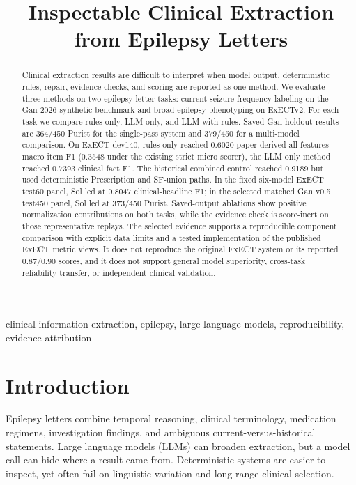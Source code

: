 \documentclass[conference]{IEEEtran}
\begin{document}
\title{Inspectable Clinical Extraction from Epilepsy Letters}

\author{}

\maketitle

\begin{abstract}
Clinical extraction results are difficult to interpret when model output,
deterministic rules, repair, evidence checks, and scoring are reported as one
method. We evaluate three methods on two
epilepsy-letter tasks: current seizure-frequency labeling on the Gan 2026
synthetic benchmark and broad epilepsy phenotyping on ExECTv2. For each task we
compare rules only, LLM only, and LLM with rules. Saved Gan holdout results are
364/450 Purist for the single-pass system and 379/450 for a multi-model
comparison. On ExECT dev140, rules only reached 0.6020 paper-derived all-features
macro item F1 (0.3548 under the existing strict micro scorer), the LLM only
method reached 0.7393 clinical fact F1. The historical combined control reached
0.9189 but used deterministic Prescription and SF-union paths. In the fixed
six-model ExECT test60 panel, Sol led at 0.8047 clinical-headline F1; in the
selected matched Gan v0.5 test450 panel, Sol led at 373/450 Purist.
Saved-output ablations show positive normalization contributions on both tasks,
while the evidence check is score-inert on those representative replays. The
selected evidence supports a reproducible component comparison with explicit
data limits and a tested implementation of the published ExECT metric views. It
does not reproduce the original ExECT system or its reported 0.87/0.90 scores,
and it does not support general model superiority, cross-task reliability
transfer, or independent clinical validation.
\end{abstract}

\begin{IEEEkeywords}
clinical information extraction, epilepsy, large language models,
reproducibility, evidence attribution
\end{IEEEkeywords}

\section{Introduction}

Epilepsy letters combine temporal reasoning, clinical terminology, medication
regimens, investigation findings, and ambiguous current-versus-historical
statements. Large language models (LLMs) can broaden extraction, but a model
call can hide where a result came from. Deterministic systems are easier to
inspect, yet often fail on linguistic variation and long-range clinical
selection.
\end{document}
